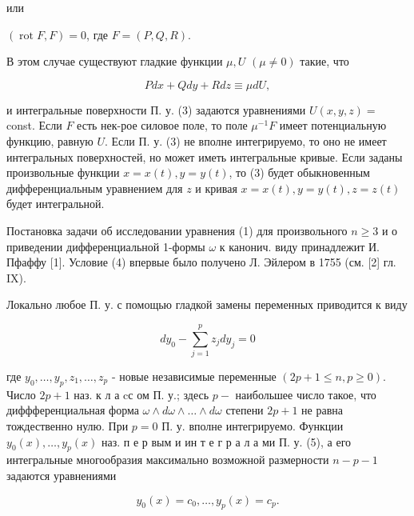 \documentclass[10pt]{article}
\begin{document}
или



$(\operatorname{rot} F, F)=0$, где $F=(P, Q, R)$.



В этом случае существуют гладкие функции $\mu, U$ $(\mu \neq 0)$ такие, что



\[

P d x+Q d y+R d z \equiv \mu d U,

\]



и интегральные поверхности П. у. (3) задаются уравнениями $U(x, y, z)=$ const. Если $F$ есть нек-рое силовое поле, то поле $\mu^{-1} F$ имеет потенциальную функцию, равную $U$. Если П. у. (3) не вполне интегрируемо, то оно не имеет интегральных поверхностей, но может иметь интегральные кривые. Если заданы произвольные функции $x=x(t), y=y(t)$, то (3) будет обыкновенным дифференциальным уравнением для $z$ и кривая $x=x(t), y=y(t), z=z(t)$ будет интегральной.



Постановка задачи об исследовании уравнения (1) для произвольного $n \geqslant 3$ и о приведении дифференциальной 1-формы $\omega$ к канонич. виду принадлежит И. Пфаффу [1]. Условие (4) впервые было получено Л. Эйлером в 1755 (см. [2] гл. IX).



Локально любое П. у. с помощью гладкой замены переменных приводится к виду



\[

d y_{0}-\sum_{j=1}^{p} z_{j} d y_{j}=0

\]



где $y_{0}, \ldots, y_{p}, z_{1}, \ldots, z_{p}$ - новые независимые переменные $(2 p+1 \leqslant n, p \geqslant 0)$. Число $2 p+1$ наз. к л а cс ом П. у.; здесь $p-$ наибольшее число такое, что диффференциальная форма $\omega \wedge d \omega \wedge \ldots \wedge d \omega$ степени $2 p+1$ не равна тождественно нулю. При $p=0$ П. у. вполне интегрируемо. Функции $y_{0}(x), \ldots, y_{p}(x)$ наз. п е р вым и ин т е г р а л а ми П. у. (5), а его интегральные многообразия максимально возможной размерности $n-p-1$ задаются уравнениями



\[

y_{0}(x)=c_{0}, \ldots, y_{p}(x)=c_{p} .

\]
\end{document}

